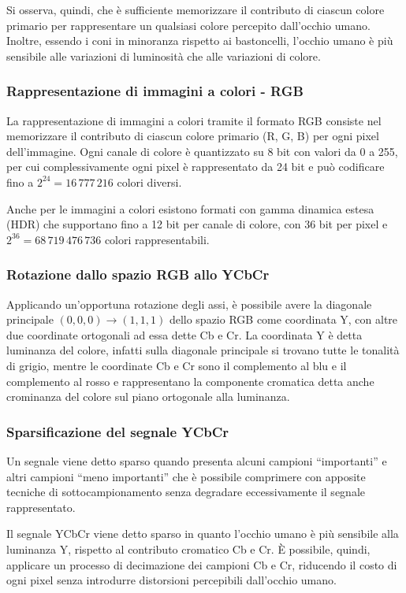 \noindent
Si osserva, quindi, che è sufficiente memorizzare il contributo di ciascun colore primario per rappresentare un qualsiasi
colore percepito dall'occhio umano. Inoltre, essendo i coni in minoranza rispetto ai bastoncelli, l'occhio umano è più
sensibile alle variazioni di luminosità che alle variazioni di colore.

\subsubsection*{Rappresentazione di immagini a colori - RGB}
La rappresentazione di immagini a colori tramite il formato RGB consiste nel memorizzare il contributo di ciascun colore
primario (R, G, B) per ogni pixel dell'immagine. Ogni canale di colore è quantizzato su 8 bit con valori da 0 a 255, per
cui complessivamente ogni pixel è rappresentato da 24 bit e può codificare fino a \(2^{24} = 16\,777\,216\) colori diversi.

Anche per le immagini a colori esistono formati con gamma dinamica estesa (HDR) che supportano fino a 12 bit per canale
di colore, con 36 bit per pixel e \(2^{36} = 68\,719\,476\,736\) colori rappresentabili.

\subsubsection*{Rotazione dallo spazio RGB allo YCbCr}
Applicando un'opportuna rotazione degli assi, è possibile avere la diagonale principale \((0,0,0) \to (1,1,1)\) dello spazio
RGB come coordinata Y, con altre due coordinate ortogonali ad essa dette Cb e Cr. La coordinata Y è detta luminanza del colore,
infatti sulla diagonale principale si trovano tutte le tonalità di grigio, mentre le coordinate Cb e Cr sono il complemento
al blu e il complemento al rosso e rappresentano la componente cromatica detta anche crominanza del colore sul piano ortogonale
alla luminanza.

\subsubsection*{Sparsificazione del segnale YCbCr}
Un segnale viene detto sparso quando presenta alcuni campioni ``importanti'' e altri campioni ``meno importanti'' che
è possibile comprimere con apposite tecniche di sottocampionamento senza degradare eccessivamente il segnale rappresentato.

Il segnale YCbCr viene detto sparso in quanto l'occhio umano è più sensibile alla luminanza Y, rispetto al contributo
cromatico Cb e Cr. È possibile, quindi, applicare un processo di decimazione dei campioni Cb e Cr, riducendo il costo
di ogni pixel senza introdurre distorsioni percepibili dall'occhio umano.


